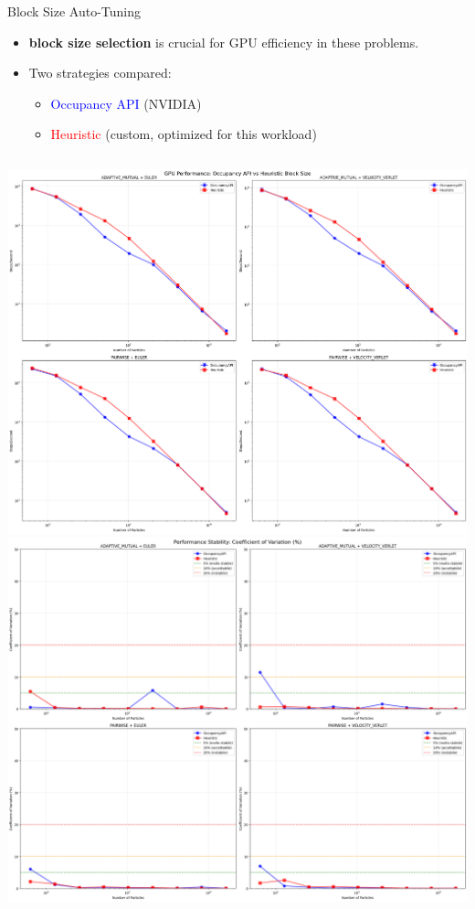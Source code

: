 \documentclass{beamer}
\begin{document}
\begin{frame}{Block Size Auto-Tuning}
    \begin{itemize}
        \item \textbf{block size selection} is crucial for GPU efficiency in these problems.
        \item Two strategies compared:
        \begin{itemize}
            \item \textcolor{blue}{Occupancy API} (NVIDIA)
            \item \textcolor{red}{Heuristic} (custom, optimized for this workload)
        \end{itemize}
    \end{itemize}
    \vspace{0.5em}
    \begin{columns}[c]
            \centering
            \includegraphics[width=0.99\linewidth]{figures/gpu_perf_blocksize.png}
            \centering
            \includegraphics[width=0.99\linewidth]{figures/gpu_stability_blocksize.png}

\end{columns}
\end{frame}
\end{document}

